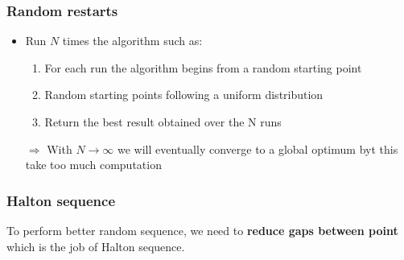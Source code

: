 \subsubsection{Random restarts}
\begin{itemize}
    \item Run $N$ times the algorithm such as:
        \begin{enumerate}
            \item For each run the algorithm begins from a random starting
                point
            \item Random starting points following a uniform distribution
            \item Return the best result obtained over the N runs
        \end{enumerate}

    \item [$\Rightarrow $] With $N \rightarrow \infty $ we will
        eventually converge to a global optimum byt this take too much
        computation
\end{itemize}

\subsubsection{Halton sequence}

To perform better random sequence, we need to \textbf{reduce gaps
between point} which is the job of Halton sequence.

